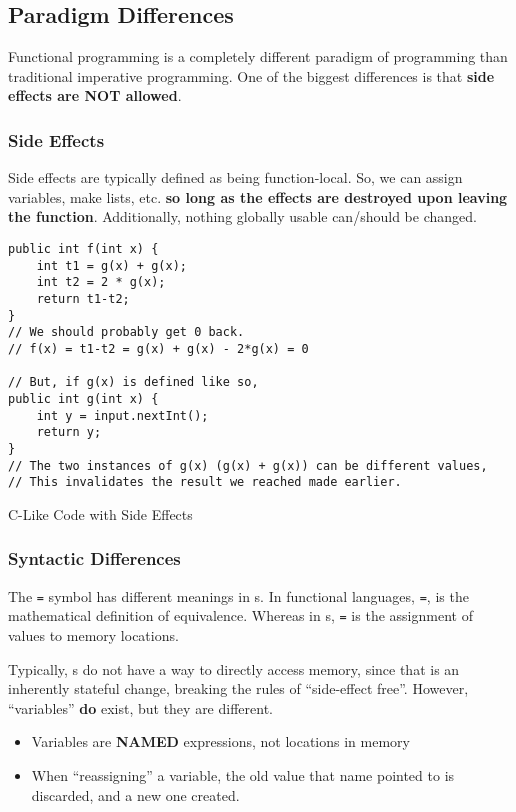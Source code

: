 \subsection{Paradigm Differences}\label{subsec:Paradigm_Differences}
Functional programming is a completely different paradigm of programming than traditional imperative programming.
One of the biggest differences is that \textbf{side effects are NOT allowed}.

\subsubsection{Side Effects}\label{subsubsec:Side_Effects}
Side effects are typically defined as being function-local.
So, we can assign variables, make lists, etc. \textbf{so long as the effects are destroyed upon leaving the function}.
Additionally, nothing globally usable can/should be changed.

\begin{listing}[h!tbp]
\begin{verbatim}
public int f(int x) {
	int t1 = g(x) + g(x);
	int t2 = 2 * g(x);
	return t1-t2;
}
// We should probably get 0 back.
// f(x) = t1-t2 = g(x) + g(x) - 2*g(x) = 0

// But, if g(x) is defined like so,
public int g(int x) {
	int y = input.nextInt();
	return y;
}
// The two instances of g(x) (g(x) + g(x)) can be different values,
// This invalidates the result we reached made earlier.
\end{verbatim}
\caption{C-Like Code with Side Effects}
\label{lst:Side_Effects}
\end{listing}

\subsubsection{Syntactic Differences}\label{subsubsec:Syntactic_Differences}
The \texttt{=} symbol has different meanings in s.
In functional languages, \texttt{=}, is the mathematical definition of equivalence.
Whereas in s, \texttt{=} is the assignment of values to memory locations.

Typically, s do not have a way to directly access memory, since that is an inherently stateful change, breaking the rules of ``side-effect free''.
However, ``variables'' \textbf{do} exist, but they are different.
\begin{itemize}[noitemsep]
\item Variables are \textbf{NAMED} expressions, not locations in memory
\item When ``reassigning'' a variable, the old value that name pointed to is discarded, and a new one created.
\end{itemize}

